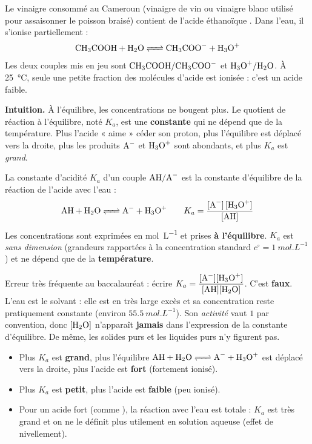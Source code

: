 \documentclass[11pt]{article}
\newcommand{\cle}[1]{{\popxbold\color{popdark}#1}}
\newcounter{popsec}
\newcounter{popsub}
\newcommand{\courssub}[1]{%
  \stepcounter{popsub}%
  \par\vspace{9pt}\noindent{\popxbold\fontsize{11.5}{13}\selectfont\color{popink}{\color{poporange}\thepopsec.\thepopsub}\hspace{6pt}#1}\par\nopagebreak\vspace{4pt}
}
\begin{document}
\begin{exemplebox}
Le vinaigre consommé au Cameroun (vinaigre de vin ou vinaigre blanc utilisé pour assaisonner le poisson braisé) contient de l'acide éthanoïque . Dans l'eau, il s'ionise partiellement :
\[ \ce{CH3COOH + H2O <=> CH3COO- + H3O+} \]
Les deux couples mis en jeu sont $\ce{CH3COOH}/\ce{CH3COO-}$ et $\ce{H3O+}/\ce{H2O}$. À \SI{25}{\celsius}, seule une petite fraction des molécules d'acide est ionisée : c'est un \cle{acide faible}.
\end{exemplebox}

\courssub{La constante d'acidité $K_a$}

\textbf{Intuition.} À l'équilibre, les concentrations ne bougent plus. Le quotient de réaction à l'équilibre, noté $K_a$, est une \textbf{constante} qui ne dépend que de la température. Plus l'acide « aime » céder son proton, plus l'équilibre est déplacé vers la droite, plus les produits $\ce{A-}$ et $\ce{H3O+}$ sont abondants, et plus $K_a$ est \emph{grand}.

\begin{definition}
La \cle{constante d'acidité} $K_a$ d'un couple $\ce{AH}/\ce{A-}$ est la constante d'équilibre de la réaction de l'acide avec l'eau :
\[ \ce{AH + H2O <=> A- + H3O+} \qquad K_a = \frac{[\ce{A-}]\,[\ce{H3O+}]}{[\ce{AH}]} \]
Les concentrations sont exprimées en \si{mol.L^{-1}} et prises \textbf{à l'équilibre}. $K_a$ est \emph{sans dimension} (grandeurs rapportées à la concentration standard $c^\circ = \SI{1}{mol.L^{-1}}$) et ne dépend que de la \textbf{température}.
\end{definition}

\begin{attention}
Erreur très fréquente au baccalauréat : écrire $K_a = \dfrac{[\ce{A-}][\ce{H3O+}]}{[\ce{AH}][\ce{H2O}]}$. C'est \textbf{faux}. L'eau est le \cle{solvant} : elle est en très large excès et sa concentration reste pratiquement constante (environ $\SI{55,5}{mol.L^{-1}}$). Son \emph{activité} vaut $1$ par convention, donc $[\ce{H2O}]$ n'apparaît \textbf{jamais} dans l'expression de la constante d'équilibre. De même, les solides purs et les liquides purs n'y figurent pas.
\end{attention}

\begin{propriete}
\begin{itemize}
\item Plus $K_a$ est \textbf{grand}, plus l'équilibre $\ce{AH + H2O <=> A- + H3O+}$ est déplacé vers la droite, plus l'acide est \textbf{fort} (fortement ionisé).
\item Plus $K_a$ est \textbf{petit}, plus l'acide est \textbf{faible} (peu ionisé).
\item Pour un acide fort (comme ), la réaction avec l'eau est totale : $K_a$ est très grand et on ne le définit plus utilement en solution aqueuse (effet de nivellement).
\end{itemize}
\end{propriete}
\end{document}
